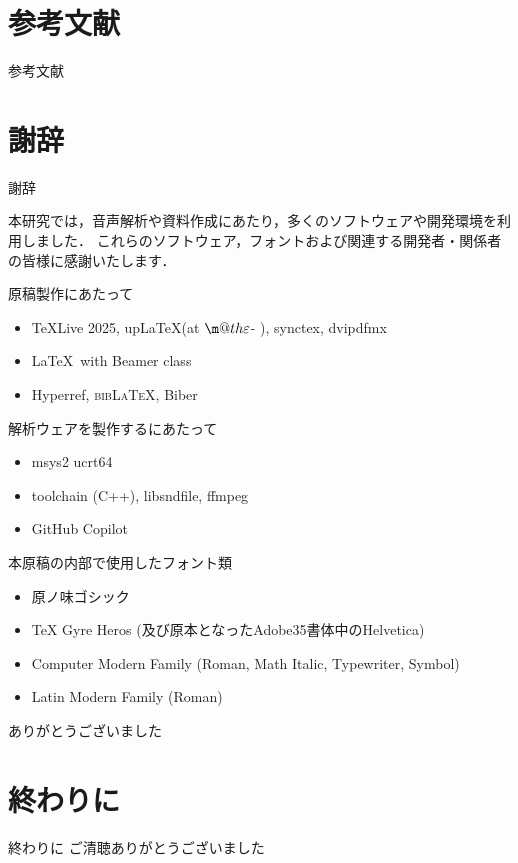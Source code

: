 \documentclass[dvipdfmx,uplatex]{beamer}
\begin{document}
\section{参考文献}

\begin{frame}{参考文献}
    \printbibliography[heading=none]
    \nocite{wasei}
    \nocite{chart}
\end{frame}

\makeatletter
\def\eupTeX{
  $\m@th\varepsilon$-\upTeX
}

\makeatother

\section{謝辞}

\begin{frame}{謝辞}

  本研究では，音声解析や資料作成にあたり，多くのソフトウェアや開発環境を利用しました．
  これらのソフトウェア，フォントおよび関連する開発者・関係者の皆様に感謝いたします．
  
  原稿製作にあたって
  \begin{itemize}
    \item \TeX Live 2025, up\LaTeX (at \eupTeX ), synctex, dvipdfmx
    \item \LaTeX\ with Beamer class
    \item Hyperref, \textsc{bib\LaTeX}, Biber
  \end{itemize}

  解析ウェアを製作するにあたって
  \begin{itemize}
    \item msys2 ucrt64
    \item toolchain (C++), libsndfile, ffmpeg
    \item GitHub Copilot
  \end{itemize}

  本原稿の内部で使用したフォント類
  \begin{itemize}
    \item 原ノ味ゴシック
    \item TeX Gyre Heros (及び原本となったAdobe35書体中のHelvetica)
    \item Computer Modern Family (Roman, Math Italic, Typewriter, Symbol)
    \item Latin Modern Family (Roman)
  \end{itemize}

  ありがとうございました

\end{frame}

\section{終わりに}

\begin{frame}{終わりに}
  \centering
  \Huge{ご清聴ありがとうございました}
\end{frame}
\end{document}
